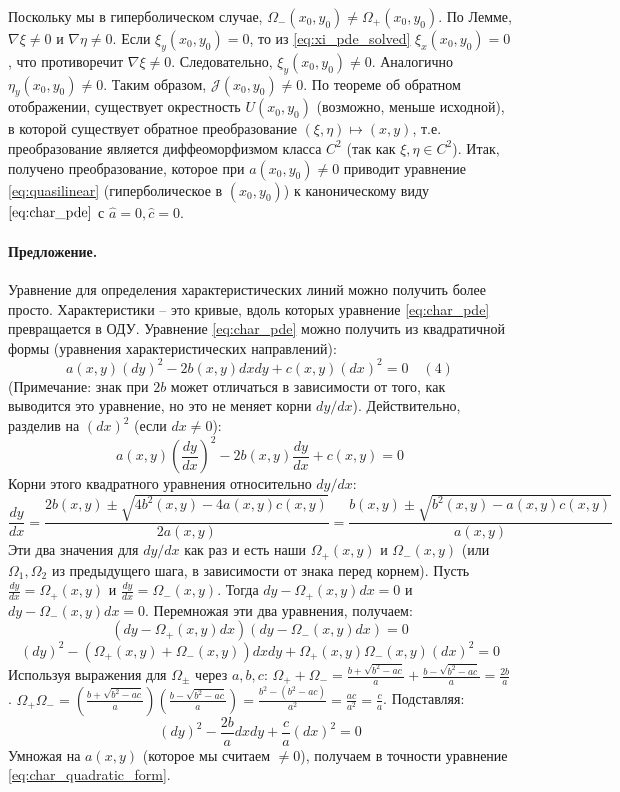 \documentclass[12pt, a4paper]{article}
\begin{document}
Поскольку мы в гиперболическом случае, $\Omega_-(x_0,y_0) \neq \Omega_+(x_0,y_0)$.
По Лемме, $\nabla\xi \neq 0$ и $\nabla\eta \neq 0$. Если $\xi_y(x_0,y_0)=0$, то из \eqref{eq:xi_pde_solved} $\xi_x(x_0,y_0)=0$, что противоречит $\nabla\xi \neq 0$. Следовательно, $\xi_y(x_0,y_0) \neq 0$. Аналогично $\eta_y(x_0,y_0) \neq 0$.
Таким образом, $\mathcal{J}(x_0,y_0) \neq 0$.
По теореме об обратном отображении, существует окрестность $U(x_0,y_0)$ (возможно, меньше исходной), в которой существует обратное преобразование $(\xi,\eta) \mapsto (x,y)$, т.е. преобразование является диффеоморфизмом класса $C^2$ (так как $\xi, \eta \in C^2$).
Итак, получено преобразование, которое при $a(x_0,y_0) \neq 0$ приводит уравнение \eqref{eq:quasilinear} (гиперболическое в $(x_0,y_0)$) к каноническому виду $\eqref{eq:char_pde}$ с $\hat{a}=0, \hat{c}=0$.

\paragraph{Предложение.} Уравнение для определения характеристических линий можно получить более просто.
Характеристики -- это кривые, вдоль которых уравнение \eqref{eq:char_pde} превращается в ОДУ.
Уравнение \eqref{eq:char_pde} можно получить из квадратичной формы (уравнения характеристических направлений):
\begin{equation} \label{eq:char_quadratic_form}
a(x,y)(dy)^2 - 2b(x,y)dxdy + c(x,y)(dx)^2 = 0 \quad (4)
\end{equation}
(Примечание: знак при $2b$ может отличаться в зависимости от того, как выводится это уравнение, но это не меняет корни $dy/dx$).
Действительно, разделив на $(dx)^2$ (если $dx \neq 0$):
\[ a(x,y)\left(\frac{dy}{dx}\right)^2 - 2b(x,y)\frac{dy}{dx} + c(x,y) = 0 \]
Корни этого квадратного уравнения относительно $dy/dx$:
\[ \frac{dy}{dx} = \frac{2b(x,y) \pm \sqrt{4b^2(x,y) - 4a(x,y)c(x,y)}}{2a(x,y)} = \frac{b(x,y) \pm \sqrt{b^2(x,y)-a(x,y)c(x,y)}}{a(x,y)} \]
Эти два значения для $dy/dx$ как раз и есть наши $\Omega_+(x,y)$ и $\Omega_-(x,y)$ (или $\Omega_1, \Omega_2$ из предыдущего шага, в зависимости от знака перед корнем).
Пусть $\frac{dy}{dx} = \Omega_+(x,y)$ и $\frac{dy}{dx} = \Omega_-(x,y)$.
Тогда $dy - \Omega_+(x,y)dx = 0$ и $dy - \Omega_-(x,y)dx = 0$.
Перемножая эти два уравнения, получаем:
\[ (dy - \Omega_+(x,y)dx)(dy - \Omega_-(x,y)dx) = 0 \]
\[ (dy)^2 - (\Omega_+(x,y) + \Omega_-(x,y))dxdy + \Omega_+(x,y)\Omega_-(x,y)(dx)^2 = 0 \]
Используя выражения для $\Omega_{\pm}$ через $a,b,c$:
$\Omega_+ + \Omega_- = \frac{b+\sqrt{b^2-ac}}{a} + \frac{b-\sqrt{b^2-ac}}{a} = \frac{2b}{a}$.
$\Omega_+\Omega_- = \left(\frac{b+\sqrt{b^2-ac}}{a}\right)\left(\frac{b-\sqrt{b^2-ac}}{a}\right) = \frac{b^2 - (b^2-ac)}{a^2} = \frac{ac}{a^2} = \frac{c}{a}$.
Подставляя:
\[ (dy)^2 - \frac{2b}{a}dxdy + \frac{c}{a}(dx)^2 = 0 \]
Умножая на $a(x,y)$ (которое мы считаем $\neq 0$), получаем в точности уравнение \eqref{eq:char_quadratic_form}.
\end{document}

